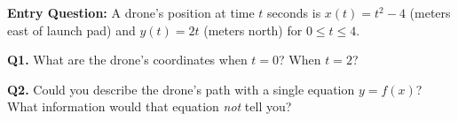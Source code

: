 \documentclass[10pt]{article}
\begin{document}
\vspace{0.08in}

\begin{hookbox}
\textbf{Entry Question:} A drone's position at time $t$ seconds is
$x(t) = t^2 - 4$ (meters east of launch pad) and $y(t) = 2t$ (meters
north) for $0 \le t \le 4$.

\vspace{4pt}
\textbf{Q1.} What are the drone's coordinates when $t = 0$? When $t = 2$?


\textbf{Q2.} Could you describe the drone's path with a single equation
$y = f(x)$? What information would that equation \emph{not} tell you?

\end{hookbox}

\vspace{0.08in}
\end{document}

